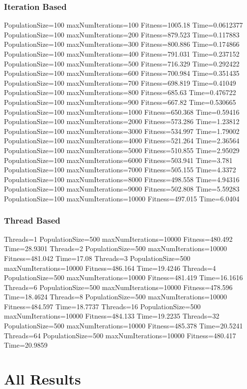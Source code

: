 \documentclass[10pt,letterpaper]{article}
\begin{document}
\subsubsection{Iteration Based}
PopulationSize=100 maxNumIterations=100 Fitness=1005.18 Time=0.0612377
PopulationSize=100 maxNumIterations=200 Fitness=879.523 Time=0.117883
PopulationSize=100 maxNumIterations=300 Fitness=800.886 Time=0.174866
PopulationSize=100 maxNumIterations=400 Fitness=791.031 Time=0.237152
PopulationSize=100 maxNumIterations=500 Fitness=716.329 Time=0.292422
PopulationSize=100 maxNumIterations=600 Fitness=700.984 Time=0.351435
PopulationSize=100 maxNumIterations=700 Fitness=698.819 Time=0.41049
PopulationSize=100 maxNumIterations=800 Fitness=685.63 Time=0.476722
PopulationSize=100 maxNumIterations=900 Fitness=667.82 Time=0.530665
PopulationSize=100 maxNumIterations=1000 Fitness=650.368 Time=0.59416
PopulationSize=100 maxNumIterations=2000 Fitness=573.286 Time=1.23812
PopulationSize=100 maxNumIterations=3000 Fitness=534.997 Time=1.79002
PopulationSize=100 maxNumIterations=4000 Fitness=521.264 Time=2.36564
PopulationSize=100 maxNumIterations=5000 Fitness=510.855 Time=2.95029
PopulationSize=100 maxNumIterations=6000 Fitness=503.941 Time=3.781
PopulationSize=100 maxNumIterations=7000 Fitness=505.155 Time=4.3372
PopulationSize=100 maxNumIterations=8000 Fitness=498.558 Time=4.94316
PopulationSize=100 maxNumIterations=9000 Fitness=502.808 Time=5.59283
PopulationSize=100 maxNumIterations=10000 Fitness=497.015 Time=6.0404

\subsubsection{Thread Based}
Threads=1 PopulationSize=500 maxNumIterations=10000 Fitness=480.492 Time=28.9301
Threads=2 PopulationSize=500 maxNumIterations=10000 Fitness=481.042 Time=17.08
Threads=3 PopulationSize=500 maxNumIterations=10000 Fitness=486.164 Time=19.4246
Threads=4 PopulationSize=500 maxNumIterations=10000 Fitness=481.419 Time=16.1616
Threads=6 PopulationSize=500 maxNumIterations=10000 Fitness=478.596 Time=18.4624
Threads=8 PopulationSize=500 maxNumIterations=10000 Fitness=484.597 Time=18.7737
Threads=16 PopulationSize=500 maxNumIterations=10000 Fitness=484.133 Time=19.2235
Threads=32 PopulationSize=500 maxNumIterations=10000 Fitness=485.378 Time=20.5241
Threads=64 PopulationSize=500 maxNumIterations=10000 Fitness=480.417 Time=20.9859


\section{All Results}
\end{document}
